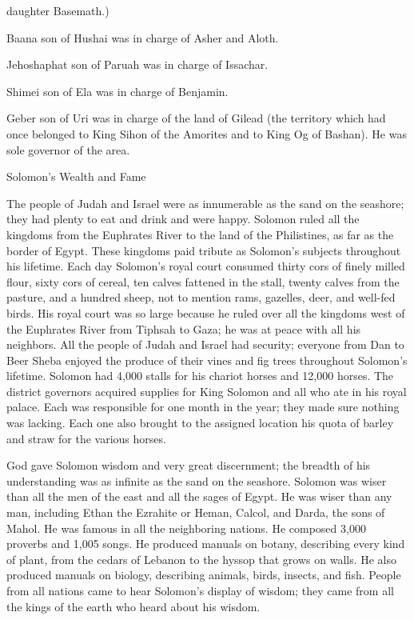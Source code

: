 {daughter
Basemath.)
\par }{\PP {}Baana
son
of Hushai
was in charge of Asher
and Aloth.
\par }{\PP {}Jehoshaphat
son
of Paruah
was in charge of Issachar.
\par }{\PP {}Shimei
son
of Ela
was in charge of Benjamin.
\par }{\PP {}Geber
son
of Uri
was in charge of the land
of Gilead
(the territory
which had
once belonged to King
Sihon
of the Amorites
and to King
Og
of Bashan). He was sole governor
of the area.
\par }{\SH Solomon’s Wealth and Fame
\par }{\PP {}The people of Judah
and Israel
were as innumerable
as the sand
on
the seashore;
they had
plenty
to eat
and drink
and were happy.
Solomon
ruled
all
the kingdoms
from
the Euphrates
River to the land
of the Philistines,
as far
as the border
of Egypt.
These kingdoms paid
tribute
as Solomon’s
subjects
throughout
his lifetime.
Each
day
Solomon’s
royal court consumed
thirty
cors
of finely milled flour,
sixty
cors
of cereal,
ten
calves
fattened
in the stall, twenty
calves
from the pasture,
and a hundred
sheep,
not to mention
rams,
gazelles,
deer,
and well-fed
birds.
His royal court was so large because
he ruled over
all
the kingdoms west
of the Euphrates River
from Tiphsah
to
Gaza;
he was
at peace
with all
his neighbors.
All the people
of Judah
and Israel
had security;
everyone
from Dan
to Beer Sheba
enjoyed
the produce of their vines
and fig trees
throughout
Solomon’s
lifetime.
Solomon
had 4,000
stalls
for his chariot
horses
and 12,000
horses.
The district governors
acquired supplies
for King
Solomon
and all
who ate
in
his royal
palace.
Each
was responsible for one month
in the year; they made sure nothing
was lacking.
Each
one also brought
to
the assigned location
his quota
of barley
and straw
for the various horses.
\par }{\PP {}God
gave
Solomon
wisdom
and very
great discernment;
the breadth
of his understanding
was as infinite as the sand
on
the seashore.
Solomon
was wiser
than
all
the men
of the east
and all
the sages
of Egypt.
He was wiser
than any
man,
including Ethan
the Ezrahite
or Heman,
Calcol,
and Darda,
the sons
of Mahol.
He was famous
in all
the neighboring
nations.
He composed
3,000
proverbs
and 1,005
songs.
He produced manuals
on
botany,
describing every kind of plant, from
the cedars
of Lebanon
to the hyssop
that
grows
on
walls.
He also produced manuals
on
biology,
describing animals,
birds,
insects,
and fish.
People from all
nations
came
to hear
Solomon’s
display of wisdom;
they came from all
the kings
of the earth
who
heard
about his wisdom.

}
